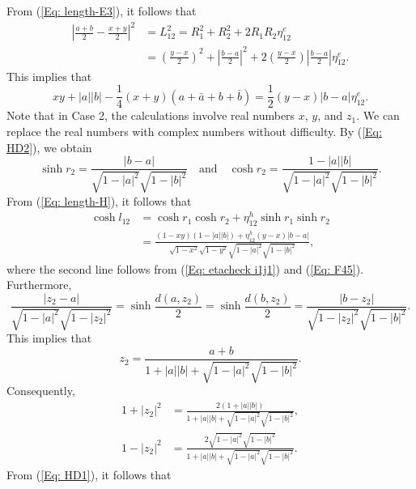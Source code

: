 \documentclass[12pt]{amsart}
\theoremstyle{definition}
\begin{document}
From (\ref{Eq: length-E3}), it follows that
\begin{align*}
\left|\frac{a+b}{2}-\frac{x+y}{2}\right|^2
&=L_{12}^2
=R_1^2+R_2^2+2R_1R_2\eta^e_{12}\\
&=\left(\frac{y-x}{2}\right)^2+\left|\frac{b-a}{2}\right|^2
+2\left(\frac{y-x}{2}\right)\left|\frac{b-a}{2}\right|\eta^e_{12}.
\end{align*}
This implies that
\begin{equation}\label{Eq: F15}
xy+|a||b|-\frac{1}{4}(x+y)(a+\bar{a}+b+\bar{b})
=\frac{1}{2}(y-x)|b-a|\eta_{12}^e.
\end{equation}
Note that in Case 2, the calculations involve real numbers $x$, $y$, and $z_1$.
We can replace the real numbers with complex numbers without difficulty.
By (\ref{Eq: HD2}), we obtain
\begin{equation}\label{Eq: etacheck i1j1}
\sinh r_2=\frac{|b-a|}{\sqrt{1-|a|^2}\sqrt{1-|b|^2}}
\quad \text{and} \quad
\cosh r_2=\frac{1-|a||b|}{\sqrt{1-|a|^2}\sqrt{1-|b|^2}}.
\end{equation}
From (\ref{Eq: length-H}), it follows that
\begin{equation}\label{Eq: F9}
\begin{aligned}
\cosh l_{12}
&=\cosh r_1\cosh r_2+\eta_{12}^h\sinh r_1\sinh r_2\\
&=\frac{(1-xy)(1-|a||b|)+\eta^h_{12}(y-x)|b-a|}{\sqrt{1-x^2}\sqrt{1-y^2}\sqrt{1-|a|^2}\sqrt{1-|b|^2}},
\end{aligned}
\end{equation}
where the second line follows from (\ref{Eq: etacheck i1j1}) and (\ref{Eq: F45}).
Furthermore,
\begin{equation*}
\frac{|z_2-a|}{\sqrt{1-|a|^2}\sqrt{1-|z_2|^2}}
=\sinh\frac{d(a,z_2)}{2}
=\sinh\frac{d(b,z_2)}{2}
=\frac{|b-z_2|}{\sqrt{1-|z_2|^2}\sqrt{1-|b|^2}}.
\end{equation*}
This implies that
\begin{equation}\label{Eq: F13}
z_2=\frac{a+b}{1+|a||b|+\sqrt{1-|a|^2}\sqrt{1-|b|^2}}.
\end{equation}
Consequently,
\begin{equation}\label{Eq: F14}
\begin{aligned}
1+|z_2|^2&=\frac{2(1+|a||b|)}{1+|a||b|+\sqrt{1-|a|^2}\sqrt{1-|b|^2}},\\
1-|z_2|^2&=\frac{2\sqrt{1-|a|^2}\sqrt{1-|b|^2}}{1+|a||b|+\sqrt{1-|a|^2}\sqrt{1-|b|^2}}.
\end{aligned}
\end{equation}
From (\ref{Eq: HD1}), it follows that
\end{document}
